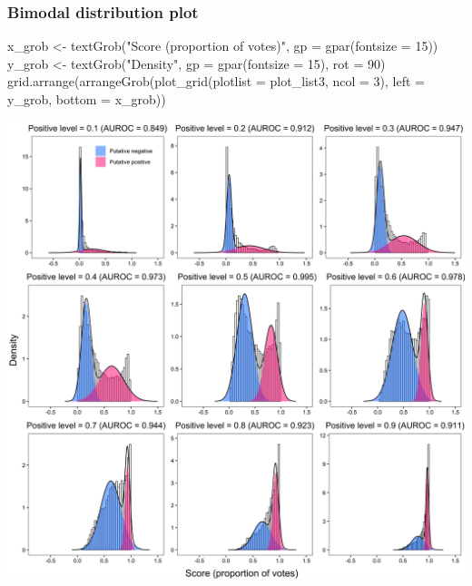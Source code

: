 \documentclass[
  11pt,
  oneside]{book}
\newenvironment{Shaded}{\begin{snugshade}}{\end{snugshade}}
\newcommand{\AttributeTok}[1]{\textcolor[rgb]{0.77,0.63,0.00}{#1}}
\newcommand{\DecValTok}[1]{\textcolor[rgb]{0.00,0.00,0.81}{#1}}
\newcommand{\FunctionTok}[1]{\textcolor[rgb]{0.00,0.00,0.00}{#1}}
\newcommand{\NormalTok}[1]{#1}
\newcommand{\OtherTok}[1]{\textcolor[rgb]{0.56,0.35,0.01}{#1}}
\newcommand{\StringTok}[1]{\textcolor[rgb]{0.31,0.60,0.02}{#1}}
\begin{document}
\hypertarget{bimodal-distribution-plot-1}{%
\subsubsection{Bimodal distribution plot}\label{bimodal-distribution-plot-1}}

\begin{Shaded}
\begin{Highlighting}[]
\NormalTok{x\_grob }\OtherTok{\textless{}{-}} \FunctionTok{textGrob}\NormalTok{(}\StringTok{"Score (proportion of votes)"}\NormalTok{, }\AttributeTok{gp =} \FunctionTok{gpar}\NormalTok{(}\AttributeTok{fontsize =} \DecValTok{15}\NormalTok{))}
\NormalTok{y\_grob }\OtherTok{\textless{}{-}} \FunctionTok{textGrob}\NormalTok{(}\StringTok{"Density"}\NormalTok{, }\AttributeTok{gp =} \FunctionTok{gpar}\NormalTok{(}\AttributeTok{fontsize =} \DecValTok{15}\NormalTok{), }\AttributeTok{rot =} \DecValTok{90}\NormalTok{)}
\FunctionTok{grid.arrange}\NormalTok{(}\FunctionTok{arrangeGrob}\NormalTok{(}\FunctionTok{plot\_grid}\NormalTok{(}\AttributeTok{plotlist =}\NormalTok{ plot\_list3, }\AttributeTok{ncol =} \DecValTok{3}\NormalTok{), }\AttributeTok{left =}\NormalTok{ y\_grob, }\AttributeTok{bottom =}\NormalTok{ x\_grob))}
\end{Highlighting}
\end{Shaded}

\begin{center}\includegraphics[width=1\linewidth]{./figures/Supplementary Fig 3} \end{center}
\end{document}
